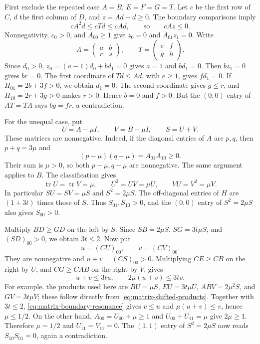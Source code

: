\documentclass[11pt,a4paper]{article}
\newcommand{\tr}{\operatorname{tr}}
\begin{document}
First exclude the repeated case $A=B$, $E=F=G=T$.
Let $c$ be the first row of $C$, $d$ the first column of $D$, and
$z=Ad-d\ge0$. The boundary comparisons imply
\[
cA^2d\le cTd\le cAd,\qquad\text{so}\qquad cAz\le0.
\]
Nonnegativity, $c_0>0$, and $A_{00}\ge1$ give
$z_0=0$ and $A_{01}z_1=0$. Write
\[
A=\begin{pmatrix}a&b\\r&s\end{pmatrix},\qquad
T=\begin{pmatrix}e&f\\g&h\end{pmatrix}.
\]
Since $d_0>0$, $z_0=(a-1)d_0+bd_1=0$ gives $a=1$ and $bd_1=0$.
Then $bz_1=0$ gives $br=0$.
The first coordinate of $Td\le Ad$, with $e\ge1$, gives $fd_1=0$.
If $H_{01}=2b+3f>0$, we obtain $d_1=0$.
The second coordinate gives $g\le r$, and $H_{10}=2r+3g>0$ makes
$r>0$. Hence $b=0$ and $f>0$.
But the $(0,0)$ entry of $AT=TA$ says $bg=fr$, a contradiction.

For the unequal case, put
\[
U=A-\mu I,\qquad V=B-\mu I,\qquad S=U+V.
\]
These matrices are nonnegative. Indeed, if the diagonal entries of $A$
are $p,q$, then $p+q=3\mu$ and
\[
(p-\mu)(q-\mu)=A_{01}A_{10}\ge0.
\]
Their sum is $\mu>0$, so both $p-\mu,q-\mu$ are nonnegative.
The same argument applies to $B$. The classification gives
\begin{equation}\label{eq:matrix-shifted-products}
\tr U=\tr V=\mu,\qquad
U^2=UV=\mu U,\qquad VU=V^2=\mu V.
\end{equation}
In particular $SU=SV=\mu S$ and $S^2=2\mu S$.
The off-diagonal entries of $H$ are $(1+3t)$ times those of $S$.
Thus $S_{01},S_{10}>0$, and the $(0,0)$ entry of $S^2=2\mu S$
also gives $S_{00}>0$.

Multiply $BD\ge GD$ on the left by $S$. Since
$SB=2\mu S$, $SG=3t\mu S$, and $(SD)_{00}>0$, we obtain
$3t\le2$. Now put
\[
u=(CU)_{00},\qquad v=(CV)_{00}.
\]
They are nonnegative and $u+v=(CS)_{00}>0$.
Multiplying $CE\ge CB$ on the right by $U$, and $CG\ge CAB$ on the
right by $V$, gives
\begin{equation}\label{eq:matrix-boundary-resonance}
u+v\le3tu,\qquad 2\mu(u+v)\le3tv.
\end{equation}
For example, the products used here are
$BU=\mu S$, $EU=3t\mu U$, $ABV=2\mu^2S$, and $GV=3t\mu V$;
these follow directly from \eqref{eq:matrix-shifted-products}.
Together with $3t\le2$, \eqref{eq:matrix-boundary-resonance} gives
$v\le u$ and $\mu(u+v)\le v$, hence $\mu\le1/2$.
On the other hand, $A_{00}=U_{00}+\mu\ge1$ and
$U_{00}+U_{11}=\mu$ give $2\mu\ge1$.
Therefore $\mu=1/2$ and $U_{11}=V_{11}=0$.
The $(1,1)$ entry of $S^2=2\mu S$ now reads
$S_{10}S_{01}=0$, again a contradiction.
\end{document}
